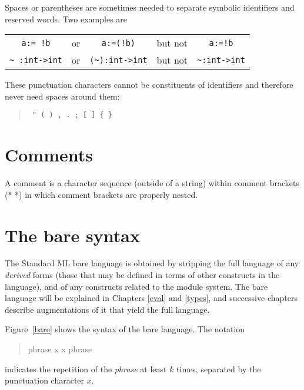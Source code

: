 Spaces or parentheses are sometimes needed 
to separate symbolic identifiers and reserved words.  Two examples are

\begin{tabular}{c c c c c}
\verb"a:= !b" &or& \verb"a:=(!b)" &but not& \verb"a:=!b"\\
\verb"~ :int->int" &or& \verb"(~):int->int" &but not& \verb"~:int->int"
\end{tabular}

These punctuation characters cannot be constituents of identifiers
and therefore never need spaces around them:
\begin{quotation}
\verb| " ( ) , . ; [ ] { } |
\end{quotation}

\section{Comments}
A comment is a character sequence (outside of a string)
within comment brackets (* *) in which comment brackets are properly
nested.

\section{The bare syntax}
The Standard ML bare language is obtained by stripping the full
language of any {\em derived} forms (those that may be defined in
terms of other constructs in the language), and of any constructs
related to the module system.  The bare language will be explained
in Chapters \ref{eval} and \ref{types},
and successive chapters describe augmentations
of it that yield the full language.

Figure~\ref{bare} shows the syntax of the bare language.  The notation
\begin{quotation}
phrase x  x phrase
\end{quotation}
indicates the repetition of the {\em phrase} at least $k$  times,
separated by the punctuation character $x$.
